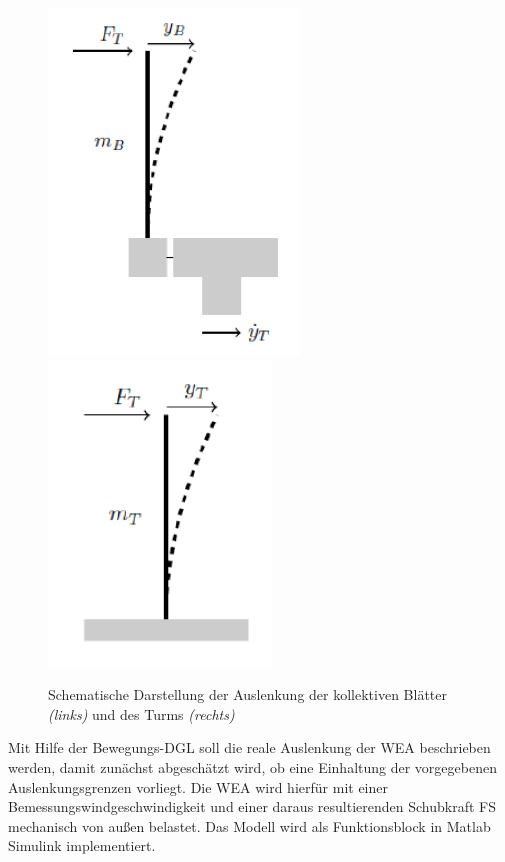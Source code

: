 \begin{figure}[H]
    \centering
    \includegraphics[scale=0.5]{Bilder/Kapitel 6/Auslenkung_Blatt.PNG}
    \includegraphics[scale=0.5]{Bilder/Kapitel 6/Auslenkung_Turm.PNG}
    \caption{Schematische Darstellung der Auslenkung der kollektiven Blätter \textit{(links)} und des Turms \textit{(rechts)}}
    \label{fig:Abbildung5.1}
\end{figure}
\newpage
Mit Hilfe der Bewegungs-DGL soll die reale Auslenkung der WEA beschrieben werden, damit zunächst abgeschätzt wird, ob eine Einhaltung der vorgegebenen Auslenkungsgrenzen vorliegt. Die WEA wird hierfür mit einer Bemessungswindgeschwindigkeit und einer daraus resultierenden Schubkraft \acs{FS} mechanisch von außen belastet. Das Modell wird als Funktionsblock in Matlab Simulink implementiert. 

